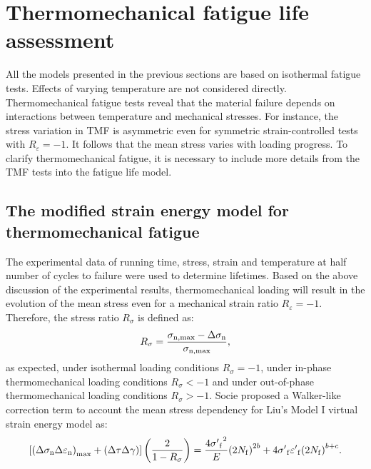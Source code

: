 \section{Thermomechanical fatigue life assessment}
\noindent
All the models presented in the previous sections are based on isothermal fatigue tests. Effects of varying temperature are not considered directly. Thermomechanical fatigue tests reveal that the material failure depends on interactions between temperature and mechanical stresses. For instance, the stress variation in TMF is asymmetric even for symmetric strain-controlled tests with $R_{\varepsilon}=-1$. It follows that the mean stress varies with loading progress. To clarify thermomechanical fatigue, it is necessary to include more details from the TMF tests into the fatigue life model.

\subsection{The modified strain energy model for thermomechanical fatigue}
\noindent
The experimental data of running time, stress, strain and temperature at half number of cycles to failure were used to determine lifetimes.
Based on the above discussion of the experimental results, thermomechanical loading will result in the evolution of the mean stress even for a mechanical strain ratio $R_{\varepsilon}=-1$. Therefore, the stress ratio ${R_\sigma }$ is defined as:
\begin{equation}
{R_\sigma } = \frac{{{\sigma _{\rm n,\max }} - \Delta {\sigma _{\rm n}}}}{{{\sigma _{\rm n,\max }}}},
\end{equation}
as expected, under isothermal loading conditions ${R_\sigma }=-1$, under in-phase thermomechanical loading conditions ${R_\sigma }<-1$ and under out-of-phase thermomechanical loading conditions ${R_\sigma }>-1$.
Socie \cite{Socie2000} proposed a Walker-like correction term \cite{Walker1970} to account the mean stress dependency for Liu's Model I virtual strain energy model as:
\begin{equation}
\left[ {{{\left( {\Delta {\sigma _{\rm n}}\Delta {\varepsilon _{\rm n}}} \right)}_{\max }} + \left( {\Delta \tau \Delta \gamma } \right)} \right]\left( {\frac{2}{{1 - {R_\sigma }}}} \right)
= \frac{{4{{\sigma '}_{\rm f}}^2}}{E}{\left( {2{N_{\rm f}}} \right)^{2b}} + 4{{\sigma '}_{\rm f}}{{\varepsilon '}_{\rm f}}{\left( {2{N_{\rm f}}} \right)^{b + c}}.
\label{Equ:LiuModelwithStressRatio}
\end{equation}

